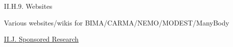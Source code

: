 \documentclass[11pt,letterpaper]{article}
\begin{document}
II.H.9. Websites

Various websites/wikis for BIMA/CARMA/NEMO/MODEST/ManyBody




























\underline{II.J. Sponsored Research}

\end{document}
